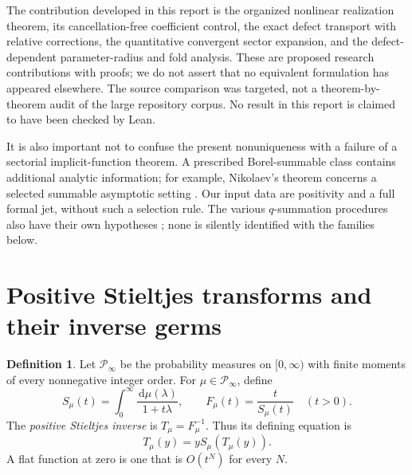 \documentclass[11pt,a4paper]{article}
\numberwithin{equation}{section}
\theoremstyle{definition}
\newtheorem{definition}[theorem]{Definition}
\theoremstyle{remark}
\newcommand{\dd}{\,\mathrm d}
\begin{document}
The contribution developed in this report is the organized nonlinear
realization theorem, its cancellation-free coefficient control, the
exact defect transport with relative corrections, the quantitative
convergent sector expansion, and the defect-dependent parameter-radius
and fold analysis. These are proposed research contributions with proofs;
we do not assert that no equivalent formulation has appeared elsewhere.
The source comparison was targeted, not a theorem-by-theorem audit of the
large repository corpus. No result in this report is claimed to have been
checked by Lean.

It is also important not to confuse the present nonuniqueness with a
failure of a sectorial implicit-function theorem. A prescribed
Borel-summable class contains additional analytic information; for
example, Nikolaev's theorem concerns a selected summable asymptotic
setting \cite{nikolaev}. Our input data are positivity and a full formal
jet, without such a selection rule. The various \(q\)-summation procedures
also have their own hypotheses \cite{divizio-zhang}; none is silently
identified with the families below.

\section{Positive Stieltjes transforms and their inverse germs}
\label{sec:framework}

\begin{definition}
Let \(\mathcal P_\infty\) be the probability measures on \([0,\infty)\)
with finite moments of every nonnegative integer order. For
\(\mu\in\mathcal P_\infty\), define
\begin{equation}
 S_\mu(t)=\int_0^\infty\frac{\dd\mu(\lambda)}{1+t\lambda},
 \qquad F_\mu(t)=\frac{t}{S_\mu(t)}
 \quad(t>0).
 \label{eq:stieltjes}
\end{equation}
The \emph{positive Stieltjes inverse} is \(T_\mu=F_\mu^{-1}\).
Thus its defining equation is
\begin{equation}
 T_\mu(y)=yS_\mu(T_\mu(y)).
 \label{eq:implicit}
\end{equation}
A flat function at zero is one that is \(O(t^N)\) for every \(N\).
\end{definition}
\end{document}
